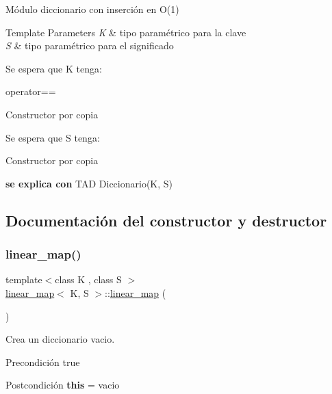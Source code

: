 Módulo diccionario con inserción en O(1) 


\begin{DoxyTemplParams}{Template Parameters}
{\em K} & tipo paramétrico para la clave \\
\hline
{\em S} & tipo paramétrico para el significado\\
\hline
\end{DoxyTemplParams}
Se espera que K tenga\+:
\begin{DoxyItemize}
\item operator==
\item Constructor por copia
\end{DoxyItemize}

Se espera que S tenga\+:
\begin{DoxyItemize}
\item Constructor por copia
\end{DoxyItemize}

{\bfseries se explica con} T\+AD Diccionario(\+K, S) 

\subsection{Documentación del constructor y destructor}
\mbox{\label{classlinear__map_a2343174c5c974fefcec889b0954debcf}} 
\subsubsection{\texorpdfstring{linear\+\_\+map()}{linear\_map()}\hspace{0.1cm}{\footnotesize\ttfamily [1/2]}}
{\footnotesize\ttfamily template$<$class K , class S $>$ \\
\mbox{\hyperlink{classlinear__map}{linear\+\_\+map}}$<$ K, S $>$\+::\mbox{\hyperlink{classlinear__map}{linear\+\_\+map}} (\begin{DoxyParamCaption}{ }\end{DoxyParamCaption})}



Crea un diccionario vacio. 

\begin{DoxyPrecond}{Precondición}
true 
\end{DoxyPrecond}
\begin{DoxyPostcond}{Postcondición}
{\bfseries this} = vacio
\end{DoxyPostcond}

